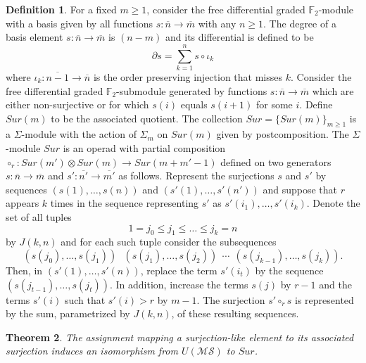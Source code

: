 \documentclass{amsart}
\newcommand{\MS}{\mathcal{MS}}
\newcommand{\F}{\mathbb{F}}
\newcommand{\tensor}{\otimes}
\newtheorem{theorem}{Theorem}
\theoremstyle{definition}
\newtheorem{definition}[theorem]{Definition}
\begin{document}
	\begin{definition}\label{Sur}
		For a fixed $m\geq1$, consider the free differential graded $\F_2$-module with a basis given by all functions $s:\overline{n}\to\overline{m}$ with any $n\geq1$. The degree of a basis element $s:\overline{n}\to\overline{m}$ is $(n-m)$ and its differential is defined to be $$\partial s=\sum_{k=1}^{n}s\circ\iota_k$$ where $\iota_k:\overline{n-1} \to \overline{n}$ is the order preserving injection that misses $k$. Consider the free differential graded $\F_2$-submodule generated by functions $s:\overline{n}\to\overline{m}$ which are either non-surjective or for which $s(i)$ equals $s(i+1)$ for some $i$. Define $Sur(m)$ to be the associated quotient. The collection $Sur=\{Sur(m)\}_{m\geq1}$ is a $\Sigma$-module with the action of $\Sigma_m$ on $Sur(m)$ given by postcomposition. The $\Sigma$-module $Sur$ is an operad with partial composition $\circ_r: Sur(m')\tensor Sur(m)\to Sur(m+m'-1)$ defined on two generators $s:\overline{n}\to\overline{m}$ and $s':\overline{n'}\to\overline{m'}$ as follows. Represent the surjections $s$ and $s'$ by sequences $(s(1),\dots,s(n))$ and $(s'(1),\dots,s'(n'))$ and suppose that $r$ appears $k$ times in the sequence representing $s'$ as $s'(i_1),\dots,s'(i_k)$. Denote the set of all tuples
		\begin{equation*}
		1 = j_0 \leq j_1 \leq \dots \leq j_k = n
		\end{equation*}
		by $J(k,n)$ and for each such tuple consider the subsequences 
		\begin{equation*}
		(s(j_0),\dots,s(j_1))\ \ \ (s(j_1),\dots,s(j_2))\ \ \cdots\ \ (s(j_{k-1}),\dots,s(j_k)).
		\end{equation*}
		Then, in $(s'(1),\dots,s'(n))$, replace the term $s'(i_t)$ by the sequence $(s(j_{t-1}),\dots,s(j_t))$. In addition, increase the terms $s(j)$ by $r-1$ and the terms $s'(i)$ such that $s'(i)>r$ by $m-1$. The surjection $s'\circ_r s$ is represented by the sum, parametrized by $J(k,n)$, of these resulting sequences.
	\end{definition}
	
	\begin{theorem}\label{Isomorphism MS and Sur}
		The assignment mapping a surjection-like element to its associated surjection induces an isomorphism from $U(\MS)$ to $Sur$.
	\end{theorem}
	
\end{document}
